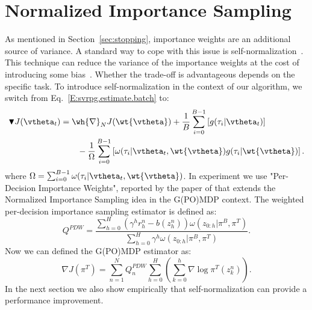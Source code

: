 \section{Normalized Importance Sampling}\label{sec:prac}
\vspace{-0.05in}
As mentioned in Section~\ref{sec:stopping}, importance weights are an additional source of variance. A standard way to cope with this issue is self-normalization~\citep[\eg][]{precup2000eligibility,owenmcbook}.
This technique can reduce the variance of the importance weights at the cost of introducing some bias~\citep[][Chapter 9]{owenmcbook}.
Whether the trade-off is advantageous depends on the specific task.  
To introduce self-normalization in the context of our algorithm, we switch from Eq.~\eqref{E:svrpg.estimate.batch} to:
\begin{align*}
\blacktriangledown J(\vtheta_{t}) &= \wh{\nabla}_N J(\wt{\vtheta}) + \frac{1}{B} \sum_{i=0}^{B-1} \left[g(\tau_i|\vtheta_t)\right]\\ 
&\qquad{} - \frac{1}{\Omega} \sum_{i=0}^{B-1} \left[ \omega(\tau_i|\vtheta_t, \wt{\vtheta}) g(\tau_i|\wt{\vtheta})
\right].
\end{align*}
where $\Omega = \sum_{i=0}^{B-1}\omega(\tau_i|\vtheta_t, \wt{\vtheta})$.
\newline
In experiment we use "Per-Decision Importance Weights", reported by the paper of \cite[\eg][]{precup2000eligibility} that extends the Normalized Importance Sampling idea in the G(PO)MDP context. 
The weighted per-decision importance sampling estimator is defined as:
\[
Q^{PDW} = \frac{\sum_{h=0}^H  \left(\gamma^h r_h^n - b(z_h^n)\right) \omega(z_{0:h}|\pi^B,\pi^T)}{\sum_{h=0}^H \gamma^h \omega(z_{0:h}|\pi^B,\pi^T)}.
\]
Now we can defined the G(PO)MDP estimator as:
\[
\nabla J(\pi^T) = \sum_{n=1}^{N} Q^{PDW}_n
	\sum_{h=0}^H \left(\sum_{k=0}^h \nabla \log\pi^T(z_k^n)\right) .
\]
\newline
In the next section we also show empirically that self-normalization can provide a performance improvement.


\vspace{-0.05in}
